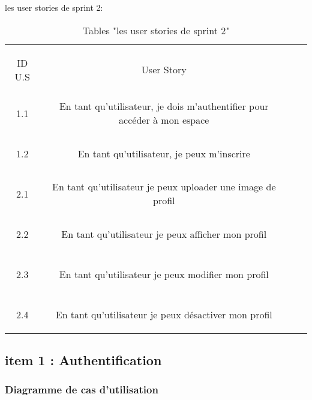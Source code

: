 
\begin{table}[h]
	{\Large \color{cyan} les user stories de sprint 2:}\\
	
	\begin{center}
		\begin{tabular}{>{\begin{bf} } c <{\end{bf}}ccc}
			
			\rowcolor{-blue!20!red}ID U.S & \begin{bf}User Story \end{bf}  & \\
			
			
			1.1  & En tant qu’utilisateur, je dois m’authentifier pour accéder à mon espace \\& \\
			1.2  & En tant qu’utilisateur, je peux m’inscrire \\& \\
			2.1 & En tant qu’utilisateur je peux uploader une image de profil \\& \\
			2.2  & En tant qu’utilisateur je peux afficher mon profil \\& \\
			2.3  & En tant qu’utilisateur je peux modifier mon profil \\& \\
			2.4 & En tant qu’utilisateur je peux désactiver mon profil \\
			
			
		\end{tabular}
	\end{center}
	\caption{Tables  "les user stories de sprint 2"}
	\label{les user stories de sprint 2}
\end{table}
		

\clearpage

\subsection{item 1 : Authentification}
\subsubsection{Diagramme de cas d’utilisation }


